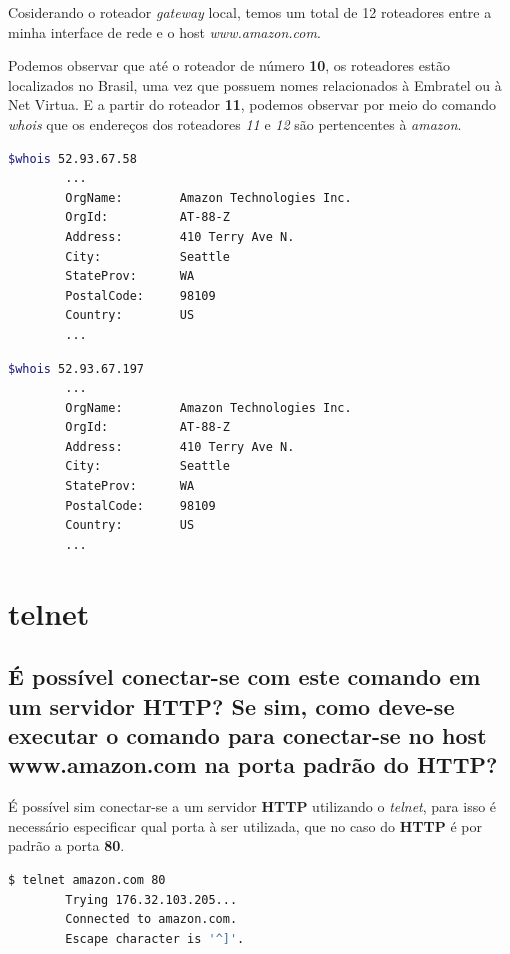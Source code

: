 \documentclass[12pt,a4paper]{report}
\begin{document}
Cosiderando o roteador \emph{gateway} local, temos um total de 12 roteadores entre a minha interface de rede e o host \emph{www.amazon.com}.

Podemos observar que até o roteador de número \textbf{10}, os roteadores estão localizados no Brasil, uma vez que possuem nomes relacionados à Embratel ou à Net Virtua.
E a partir do roteador \textbf{11}, podemos observar por meio do comando \emph{whois} que os endereços dos roteadores \emph{11} e \emph{12} são pertencentes à \emph{amazon}.

\begin{lstlisting}[language=bash]
        $whois 52.93.67.58
        ... 
        OrgName:        Amazon Technologies Inc.
        OrgId:          AT-88-Z
        Address:        410 Terry Ave N.
        City:           Seattle
        StateProv:      WA
        PostalCode:     98109
        Country:        US
        ...
\end{lstlisting}


\begin{lstlisting}[language=bash]
        $whois 52.93.67.197
        ... 
        OrgName:        Amazon Technologies Inc.
        OrgId:          AT-88-Z
        Address:        410 Terry Ave N.
        City:           Seattle
        StateProv:      WA
        PostalCode:     98109
        Country:        US
        ...
\end{lstlisting}





\section{telnet}
\subsection{É possível conectar-se com este comando em um servidor HTTP? Se sim, como deve-se executar o comando para conectar-se no host www.amazon.com na porta padrão do HTTP?}
É possível sim conectar-se a um servidor \textbf{HTTP} utilizando o \emph{telnet}, para isso é necessário especificar qual porta à ser utilizada, que no caso do \textbf{HTTP} é por padrão a porta \textbf{80}.
\begin{lstlisting}[language=bash]
        $ telnet amazon.com 80
        Trying 176.32.103.205...
        Connected to amazon.com.
        Escape character is '^]'.
\end{lstlisting}
\end{document}
